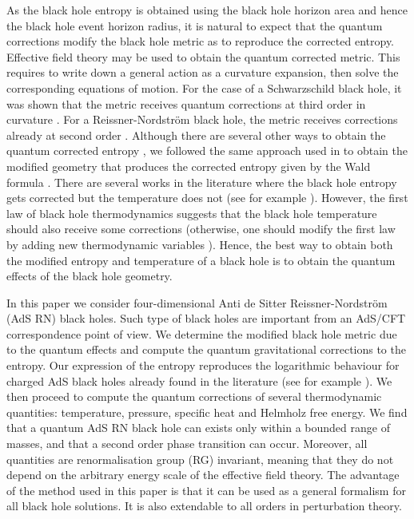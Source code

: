 \documentclass[10pt,a4paper]{article}
\begin{document}
As the black hole entropy is obtained using the black hole horizon area and hence the black hole event horizon radius, it is natural to expect that the quantum corrections modify the black hole metric as to reproduce the corrected entropy. Effective field theory may be used to obtain the quantum corrected metric. This requires to write down a general action as a curvature expansion, then solve the corresponding equations of motion. For the case of a Schwarzschild black hole, it was shown that the metric receives quantum corrections at third order in curvature \cite{Calmet:2021lny}. For a Reissner-Nordstr\"om black hole, the metric receives corrections already at second order \cite{Delgado:2022pcc}. Although there are several other ways to obtain the quantum corrected entropy \cite{Cano:2019ycn,PhysRevD.62.024001,Yoon:2007aj,Akbar:2003mv, Sadeghi:2014zna}, we followed the same approach used in \cite{Calmet:2021lny, Delgado:2022pcc} to obtain the modified geometry that produces the corrected entropy given by the Wald formula \cite{Wald:1993nt}. There are several works in the literature where the black hole entropy gets corrected but the temperature does not (see for example \cite{Pourhassan:2016qoz, Khan:2021tzv}). However, the first law of black hole thermodynamics suggests that the black hole temperature should also receive some corrections (otherwise, one should modify the first law by adding new thermodynamic variables \cite{Dehghani:2021qzm}). Hence, the best way to obtain both the modified entropy and temperature of a black hole is to obtain the quantum effects of the black hole geometry.

In this paper we consider four-dimensional Anti de Sitter Reissner-Nordstr\"om (AdS RN) black holes. Such type of black holes are important from an AdS/CFT correspondence point of view. We determine the modified black hole metric due to the quantum effects and compute the quantum gravitational corrections to the entropy. Our expression of the entropy reproduces the logarithmic behaviour for charged AdS black holes already found in the literature (see for example \cite{Das:2001ic, Sadeghi:2016dvc}). We then proceed to compute the quantum corrections of several thermodynamic quantities: temperature, pressure, specific heat and Helmholz free energy. We find that a quantum AdS RN black hole can exists only within a bounded range of masses, and that a second order phase transition can occur. Moreover, all quantities are renormalisation group (RG) invariant, meaning that they do not depend on the arbitrary energy scale of the effective field theory. 
The advantage of the method used in this paper is that it can be used as a general formalism for all black hole solutions. It is also extendable to all orders in perturbation theory. 
\end{document}
